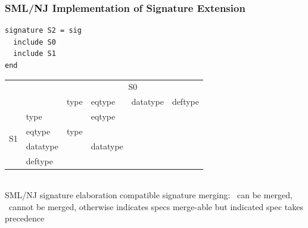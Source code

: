 \documentclass{beamer}
\newcommand{\chk}{\ding{51}}
\newcommand{\ex}{\ding{55}}
\begin{document}
\begin{frame}[fragile]
\frametitle{SML/NJ Implementation of Signature Extension}
\begin{lstlisting}
signature S2 = sig
  include S0
  include S1 
end	
\end{lstlisting}
\begin{tabular}{ll|l|l|l|l|}
 \multicolumn{2}{c}{} & \multicolumn{4}{c}{S0}\\
  \multicolumn{2}{c|}{}    & type & eqtype & datatype & deftype \\
\hline 
\multirow{4}{*}{S1} & type & \chk & eqtype & \ex & \ex\\
 & eqtype & type & \chk & \ex & \ex\\
 & datatype & \chk & datatype & \ex & \ex\\
 & deftype & \ex & \ex & \ex & \ex\\
\hline
\end{tabular} \\
SML/NJ signature elaboration compatible signature merging: \chk~can be merged, \ex~cannot be merged, otherwise indicates specs merge-able but indicated spec takes precedence
	
\end{frame}

\end{document}
